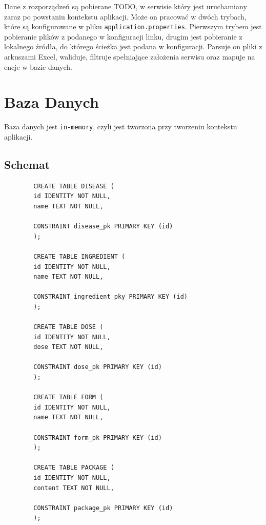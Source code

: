 \documentclass{article}
\begin{document}
    Dane z rozporządzeń są pobierane TODO, w serwisie który jest uruchamiany zaraz po powstaniu kontekstu aplikacji.
    Może on pracować w dwóch trybach, które są konfigurowane w pliku \texttt{application.properties}.
    Pierwszym trybem jest pobieranie plików z podanego w konfiguracji linku,
    drugim jest pobieranie z lokalnego źródła, do którego ścieżka jest podana w konfiguracji.
    Parsuje on pliki z arkuszami Excel, waliduje, filtruje spełniające założenia serwisu oraz mapuje na encje w bazie danych.
  \section{Baza Danych}
  Baza danych jest \texttt{in-memory}, czyli jest tworzona przy tworzeniu kontekstu aplikacji.

  \subsection{Schemat}
    \noindent
    \begin{minipage}{.45\textwidth}
      \begin{lstlisting}
        CREATE TABLE DISEASE (
        id IDENTITY NOT NULL,
        name TEXT NOT NULL,

        CONSTRAINT disease_pk PRIMARY KEY (id)
        );

        CREATE TABLE INGREDIENT (
        id IDENTITY NOT NULL,
        name TEXT NOT NULL,

        CONSTRAINT ingredient_pky PRIMARY KEY (id)
        );

        CREATE TABLE DOSE (
        id IDENTITY NOT NULL,
        dose TEXT NOT NULL,

        CONSTRAINT dose_pk PRIMARY KEY (id)
        );

        CREATE TABLE FORM (
        id IDENTITY NOT NULL,
        name TEXT NOT NULL,

        CONSTRAINT form_pk PRIMARY KEY (id)
        );

        CREATE TABLE PACKAGE (
        id IDENTITY NOT NULL,
        content TEXT NOT NULL,

        CONSTRAINT package_pk PRIMARY KEY (id)
        );
      \end{lstlisting}
    \end{minipage}\hfill
\end{document}
